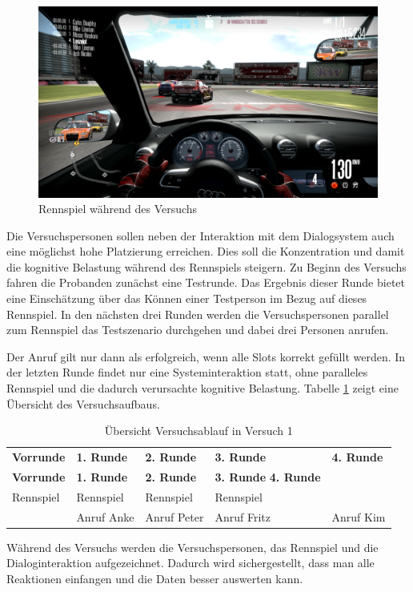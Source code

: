 \documentclass[12pt,a4paper]{scrartcl}
\begin{document}
\begin{figure}[H]
\begin{center}
\includegraphics[width=14cm]{nfs.png}
\caption{Rennspiel während des Versuchs}
\label{nfsss}
\end{center}
\end{figure}

Die Versuchspersonen sollen neben der Interaktion mit dem Dialogsystem auch eine möglichst hohe Platzierung erreichen. Dies soll die Konzentration und damit die kognitive Belastung während des Rennspiels steigern. Zu Beginn des Versuchs fahren die Probanden zunächst eine Testrunde. Das Ergebnis dieser Runde bietet eine Einschätzung über das Können einer Testperson im Bezug auf dieses Rennspiel. In den nächsten drei Runden werden die Versuchspersonen parallel zum Rennspiel das Testszenario durchgehen und dabei drei Personen anrufen. 

 Der Anruf gilt nur dann als erfolgreich, wenn alle Slots korrekt gefüllt werden. 
In der letzten Runde findet nur eine Systeminteraktion statt, ohne paralleles Rennspiel und die dadurch verursachte kognitive Belastung. 
Tabelle \ref{ablauf1} zeigt eine Übersicht des Versuchsaufbaus.

\begin{longtable}{p{}p{}p{}p{}p{} }
	\label{ablauf1}\\
	\caption[Übersicht Versuchsablauf in Versuch 1]{Übersicht Versuchsablauf in Versuch 1}\\
	\hline
	\textbf{Vorrunde}&\textbf{1. Runde}&\textbf{2. Runde} &\textbf{3. Runde} & \textbf{4. Runde}\\
	\hline
	\endfirsthead
	\hline
	\textbf{Vorrunde}&\textbf{1. Runde}&\textbf{2. Runde} &\textbf{3. Runde} \textbf{4. Runde}\\
	\hline
	\endhead
Rennspiel & Rennspiel & Rennspiel & Rennspiel &\\
 & Anruf Anke & Anruf Peter & Anruf Fritz & Anruf Kim \\
\hline
\end{longtable}
Während des Versuchs werden die Versuchspersonen, das Rennspiel und die Dialoginteraktion aufgezeichnet. Dadurch wird sichergestellt, dass man alle Reaktionen einfangen und die Daten besser auswerten kann. 
\end{document}
